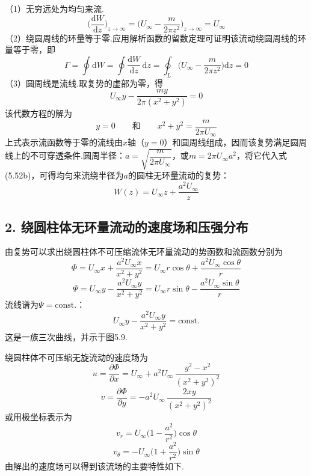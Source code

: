 （1）无穷远处为均匀来流.
\[
\Big(\frac{\mathrm{d}W}{\mathrm{d}z}\Big)_{z\to\infty}=\Big(U_\infty-\frac{m}{2\pi z^{2}}\Big)_{z\to\infty}=U_\infty
\]
（2）绕圆周线的环量等于零.应用解析函数的留数定理可证明该流动绕圆周线的环量等于零，即
\[
\Gamma=\oint\mathrm{d}W=\oint\frac{\mathrm{d}W}{\mathrm{d}z}\,\mathrm{d}z=\oint_L\Big(U_\infty-\frac{m}{2\pi z^{2}}\Big)\mathrm{d}z=0
\]
（3）圆周线是流线.取复势的虚部为零，得
\[
U_\infty y-\frac{my}{2\pi(x^{2}+y^{2})}=0
\]
该代数方程的解为
\[
y=0\qquad\text{和}\qquad x^{2}+y^{2}=\frac{m}{2\pi U_\infty}
\]
上式表示流函数等于零的流线由$x$轴（$y=0$）和圆周线组成，因而该复势满足圆周线上的不可穿透条件.圆周半径：$a=\sqrt{\dfrac{m}{2\pi U_\infty}}$，或$m=2\pi U_\infty a^{2}$，将它代入式(5.52b)，可得均匀来流绕半径为$a$的圆柱无环量流动的复势：
\begin{equation*}
W(z)=U_\infty z+\frac{a^{2}U_\infty}{z}
\tag{5.53}
\end{equation*}

\subsection*{2. 绕圆柱体无环量流动的速度场和压强分布}

由复势可以求出绕圆柱体不可压缩流体无环量流动的势函数和流函数分别为
\begin{equation*}
\Phi=U_\infty x+\frac{a^{2}U_\infty x}{x^{2}+y^{2}}=U_\infty r\cos\theta+\frac{a^{2}U_\infty\cos\theta}{r}
\tag{5.54}
\end{equation*}
\begin{equation*}
\Psi=U_\infty y-\frac{a^{2}U_\infty y}{x^{2}+y^{2}}=U_\infty r\sin\theta-\frac{a^{2}U_\infty\sin\theta}{r}
\tag{5.55}
\end{equation*}
流线谱为$\Psi=\mathrm{const.}$：
\begin{equation*}
U_\infty y-\frac{a^{2}U_\infty y}{x^{2}+y^{2}}=\mathrm{const.}
\tag{5.56}
\end{equation*}
这是一族三次曲线，并示于图5.9.

绕圆柱体不可压缩无旋流动的速度场为
\begin{equation*}
u=\frac{\partial\Phi}{\partial x}=U_\infty+a^{2}U_\infty\,\frac{y^{2}-x^{2}}{(x^{2}+y^{2})^{2}}
\tag{5.57a}
\end{equation*}
\begin{equation*}
v=\frac{\partial\Phi}{\partial y}=-a^{2}U_\infty\,\frac{2xy}{(x^{2}+y^{2})^{2}}
\tag{5.57b}
\end{equation*}
或用极坐标表示为
\begin{equation*}
v_r=U_\infty\Big(1-\frac{a^{2}}{r^{2}}\Big)\cos\theta
\tag{5.57c}
\end{equation*}
\begin{equation*}
v_\theta=-U_\infty\Big(1+\frac{a^{2}}{r^{2}}\Big)\sin\theta
\tag{5.57d}
\end{equation*}
由解出的速度场可以得到该流场的主要特性如下.

